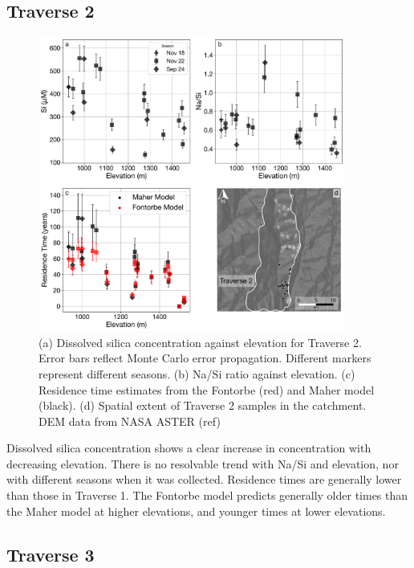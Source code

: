 \subsection{Traverse 2}

\begin{figure}[h]
    \centering
        \includegraphics[width=0.9\textwidth]{Traverse_2_summary.pdf}
    \caption{(a) Dissolved silica concentration against elevation for Traverse 2. Error bars reflect Monte Carlo error propagation. Different markers represent different seasons. (b) Na/Si ratio against elevation. (c) Residence time estimates from the Fontorbe (red) and Maher model (black). (d) Spatial extent of Traverse 2 samples in the catchment. DEM data from NASA ASTER (ref)}
    \label{fig:trav2}
\end{figure}

\FloatBarrier

Dissolved silica concentration shows a clear increase in concentration with decreasing elevation. There is no resolvable trend with Na/Si and elevation, nor with different seasons when it was collected. Residence times are generally lower than those in Traverse 1. The Fontorbe model predicts generally older times than the Maher model at higher elevations, and younger times at lower elevations. 




\subsection{Traverse 3}

